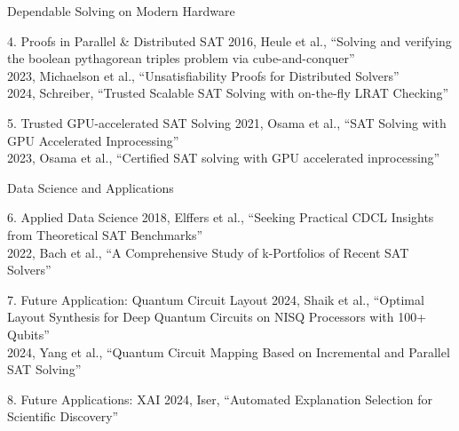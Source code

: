 \documentclass[de]{sdqbeamer}
\begin{document}
\begin{frame}{Dependable Solving on Modern Hardware}
	\begin{exampleblock}{4. Proofs in Parallel \& Distributed SAT}
		2016, Heule et al., “Solving and verifying the boolean pythagorean triples problem via cube-and-conquer”\\
		2023, Michaelson et al., “Unsatisfiability Proofs for Distributed Solvers”\\
		2024, Schreiber, “Trusted Scalable SAT Solving with on-the-fly LRAT Checking”
	\end{exampleblock}
	\begin{exampleblock}{5. Trusted GPU-accelerated SAT Solving}
		2021, Osama et al., “SAT Solving with GPU Accelerated Inprocessing”\\
		2023, Osama et al., “Certified SAT solving with GPU accelerated inprocessing”
	\end{exampleblock}
\end{frame}

\begin{frame}{Data Science and Applications}
	\begin{exampleblock}{6. Applied Data Science}
		2018, Elffers et al., “Seeking Practical CDCL Insights from Theoretical SAT Benchmarks”\\
		2022, Bach et al., “A Comprehensive Study of k-Portfolios of Recent SAT Solvers”
	\end{exampleblock}
	\begin{exampleblock}{7. Future Application: Quantum Circuit Layout}
		2024, Shaik et al., “Optimal Layout Synthesis for Deep Quantum Circuits on NISQ Processors with 100+ Qubits”\\
		2024, Yang et al., “Quantum Circuit Mapping Based on Incremental and Parallel SAT Solving”
	\end{exampleblock}
	\begin{exampleblock}{8. Future Applications: XAI}
		2024, Iser, “Automated Explanation Selection for Scientific Discovery”
	\end{exampleblock}
\end{frame}
\end{document}

